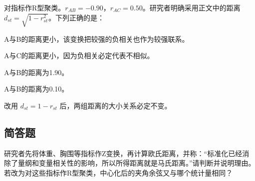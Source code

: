 \par\addvspace{6pt}\noindent\begin{minipage}{\linewidth}


对指标作R型聚类。\(r_{AB}=-0.90\)，\(r_{AC}=0.50\)。研究者明确采用正文中的距离 \(d_{st}=\sqrt{1-r_{st}^2}\)。下列正确的是：


\begin{choices}

\item A与B的距离更小，该变换把较强的负相关也作为较强联系。

\item A与C的距离更小，因为负相关必定代表不相似。

\item A与B的距离为1.90。

\item A与B的距离为0.10。

\item 改用 \(d_{st}=1-r_{st}\) 后，两组距离的大小关系必定不变。

\end{choices}

\end{minipage}\par\vspace{4pt}

\par\addvspace{6pt}\noindent\begin{minipage}{\linewidth}

\subsection{简答题}


研究者先将体重、胸围等指标作Z变换，再计算欧氏距离，并称：``标准化已经消除了量纲和变量相关性的影响，所以所得距离就是马氏距离。''请判断并说明理由。若改为对这些指标作R型聚类，中心化后的夹角余弦又与哪个统计量相同？



\end{minipage}\par\vspace{4pt}

